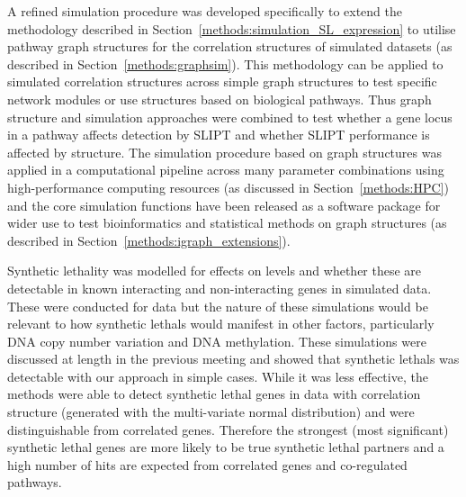 A refined simulation procedure was developed specifically to extend the methodology described in Section~\ref{methods:simulation_SL_expression} to utilise pathway \gls{graph} structures for the correlation structures of simulated datasets (as described in Section~\ref{methods:graphsim}). This methodology can be applied to simulated correlation structures across simple \gls{graph} structures to test specific network modules or use  structures based on biological pathways. Thus \gls{graph} structure and simulation approaches were combined to test whether a gene locus in a pathway affects detection by \gls{SLIPT} and whether \gls{SLIPT} performance is affected by  structure. The simulation procedure based on \gls{graph} structures was applied in a computational pipeline across many parameter combinations using high-performance computing resources (as discussed in Section~\ref{methods:HPC}) and the core simulation functions have been released as a software package for wider use to test \gls{bioinformatics} and statistical methods on \gls{graph} structures (as described in Section~\ref{methods:igraph_extensions}).

\iffalse
Synthetic lethality was modelled for effects on  levels and whether these are detectable in known interacting and non-interacting genes in simulated data. These were conducted for  data but the nature of these simulations would be relevant to how \glspl{synthetic lethal} would manifest in other factors, particularly \acrshort{DNA} \gls{copy number} variation and \acrshort{DNA} methylation. These simulations were discussed at length in the previous meeting and showed that \glspl{synthetic lethal} was detectable with our approach in simple cases. While it was less effective, the methods were able to detect \gls{synthetic lethal} genes in  data with correlation structure (generated with the multi-variate normal distribution) and were distinguishable from correlated genes. Therefore the strongest (most significant) \gls{synthetic lethal} genes are more likely to be true \gls{synthetic lethal} partners and a high number of hits are expected from correlated genes and co-regulated pathways.

